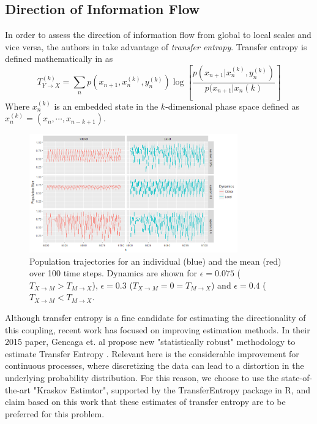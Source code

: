\documentclass[conference]{IEEEtran}
\begin{document}
\subsection{Direction of Information Flow}
\noindent In order to assess the direction of information flow from global to local scales and vice versa, the authors in \cite{Walker} take advantage of {\it transfer entropy}. Transfer entropy is defined mathematically in \cite{Schreiber} as
$$T^{(k)}_{Y \rightarrow X} = \sum_n p(x_{n+1}, x_n^{(k)}, y_n^{(k)}) \log \left[ \frac{p(x_{n+1}|x_n^{(k)}, y_n^{(k)})}{p(x_{n+1}|x_n{(k)}}\right]$$
Where $x_n^{(k)}$ is an embedded state in the $k$-dimensional phase space defined as $x_n^{(k)} = (x_n, \cdots, x_{n-k+1})$. \\
\begin{figure}[t]
\centering
 \includegraphics[width=90mm]{Fig5}
    
  \caption{Population trajectories for an individual (blue) and the mean (red) over 100 time steps. Dynamics are shown for $\epsilon = 0.075$ ($T_{X\rightarrow M} > T_{M\rightarrow X}$), $\epsilon = 0.3$ ($T_{X\rightarrow M} = 0 = T_{M\rightarrow X}$) and $\epsilon = 0.4$ ($T_{X\rightarrow M} < T_{M\rightarrow X}$. }
 \label{timeseries}
\end{figure}



\noindent Although transfer entropy is a fine candidate for estimating the directionality of this coupling, recent work has focused on improving estimation methods. In their 2015 paper, Gencaga et. al propose new "statistically robust" methodology to estimate Transfer Entropy \cite{recipe}. Relevant here is the considerable improvement for continuous processes, where discretizing the data can lead to a distortion in the underlying probability distribution. For this reason, we choose to use the state-of-the-art "Kraskov Estimtor", supported by the TransferEntropy\cite{TE} package in R, and claim based on this work that these estimates of transfer entropy are to be preferred for this problem. \\
\end{document}
